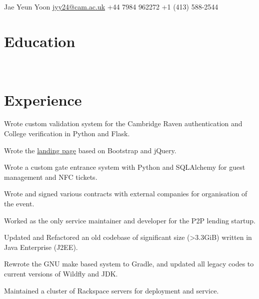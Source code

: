 \documentclass[]{deedy-resume-openfont}
\begin{document}
%
%
\lastupdated

%
%


 {Jae Yeun Yoon}{
\href{mailto:jyy24@cam.ac.uk}{jyy24@cam.ac.uk} \textbullet{} +44 7984 962272 \textbullet{} +1 (413) 588-2544
}

\section{Education}
\sectionsep

 \\
\sectionsep

\section{Experience}

\vspace{\topsep}
\begin{tightemize}
\item Wrote custom validation system for the Cambridge Raven authentication and College verification in Python and Flask.
\item Wrote the \href{http://kingsaffair.com/2018}{landing page} based on Bootstrap and jQuery.
\item Wrote a custom gate entrance system with Python and SQLAlchemy for guest management and NFC tickets.
\item Wrote and signed various contracts with external companies for organisation of the event.
\end{tightemize}
\sectionsep

\vspace{\topsep}
\begin{tightemize}
\item Worked as the only service maintainer and developer for the P2P lending startup.
\item Updated and Refactored an old codebase of significant size (>3.3GiB) written in Java Enterprise (J2EE).
\item Rewrote the GNU make based system to Gradle, and updated all legacy codes to current versions of Wildfly and JDK.
\item Maintained a cluster of Rackspace servers for deployment and service.
\end{tightemize}
\sectionsep
\end{document}
